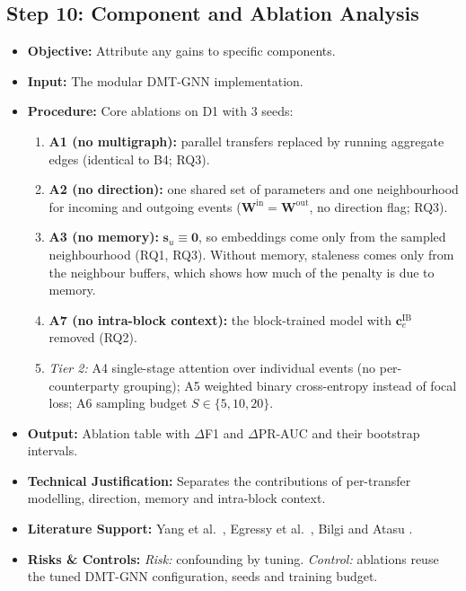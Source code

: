 \documentclass[11pt,a4paper]{article}
\begin{document}
\subsection{Step 10: Component and Ablation Analysis}
\begin{itemize}[leftmargin=*]
    \item \textbf{Objective:} Attribute any gains to specific components.
    \item \textbf{Input:} The modular DMT-GNN implementation.
    \item \textbf{Procedure:} Core ablations on D1 with 3 seeds:
    \begin{enumerate}[leftmargin=*]
        \item \textbf{A1 (no multigraph):} parallel transfers replaced by running aggregate edges (identical to B4; RQ3).
        \item \textbf{A2 (no direction):} one shared set of parameters and one neighbourhood for incoming and outgoing events ($\mathbf{W}^{\text{in}}=\mathbf{W}^{\text{out}}$, no direction flag; RQ3).
        \item \textbf{A3 (no memory):} $\mathbf{s}_u\equiv\mathbf{0}$, so embeddings come only from the sampled neighbourhood (RQ1, RQ3). Without memory, staleness comes only from the neighbour buffers, which shows how much of the penalty is due to memory.
        \item \textbf{A7 (no intra-block context):} the block-trained model with $\mathbf{c}^{\text{IB}}_e$ removed (RQ2).
        \item \textit{Tier 2:} A4 single-stage attention over individual events (no per-counterparty grouping); A5 weighted binary cross-entropy instead of focal loss; A6 sampling budget $S\in\{5,10,20\}$.
    \end{enumerate}
    \item \textbf{Output:} Ablation table with $\Delta$F1 and $\Delta$PR-AUC and their bootstrap intervals.
    \item \textbf{Technical Justification:} Separates the contributions of per-transfer modelling, direction, memory and intra-block context.
    \item \textbf{Literature Support:} Yang et al.\ \cite{yang2025generaldyg}, Egressy et al.\ \cite{egressy2024multigraph}, Bilgi and Atasu \cite{bilgi2026mega}.
    \item \textbf{Risks \& Controls:} \textit{Risk:} confounding by tuning. \textit{Control:} ablations reuse the tuned DMT-GNN configuration, seeds and training budget.
\end{itemize}
\end{document}
